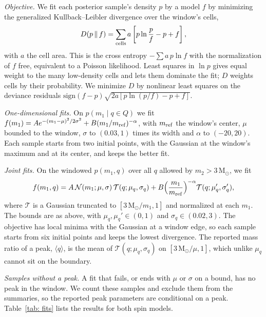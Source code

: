\documentclass[%
 reprint,
 amsmath,amssymb,
 aps,
 prl,
 nofootinbib,nobibnotes,
 floatfix,
]{revtex4-2}
\newcommand{\Msun}{\ensuremath{\mathrm{M}_{\odot}}}
\begin{document}
\textit{Objective.} We fit each posterior sample's density $p$ by a model $f$ by minimizing the generalized Kullback--Leibler divergence over the window's cells,
\begin{equation}
    D(p \,\|\, f) = \sum_{\rm cells} a \left[p \ln\frac{p}{f} - p + f\right],
\end{equation}
with $a$ the cell area. This is the cross entropy $-\sum a\, p \ln f$ with the normalization of $f$ free, equivalent to a Poisson likelihood. Least squares in $\ln p$ gives equal weight to the many low-density cells and lets them dominate the fit; $D$ weights cells by their probability. We minimize $D$ by nonlinear least squares on the deviance residuals $\mathrm{sign}(f - p)\sqrt{2a[p\ln(p/f) - p + f]}$.

\textit{One-dimensional fits.} On $p(m_1 \mid q \in Q)$ we fit $f(m_1) = A e^{-(m_1 - \mu)^2/2\sigma^2} + B(m_1/m_{\rm ref})^{-\alpha}$, with $m_{\rm ref}$ the window's center, $\mu$ bounded to the window, $\sigma$ to $(0.03, 1)$ times its width and $\alpha$ to $(-20, 20)$. Each sample starts from two initial points, with the Gaussian at the window's maximum and at its center, and keeps the better fit.

\textit{Joint fits.} On the windowed $p(m_1, q)$ over all $q$ allowed by $m_2 > 3\,\Msun$, we fit
\begin{equation}
    f(m_1, q) = A\, \mathcal{N}(m_1; \mu, \sigma)\, \mathcal{T}(q; \mu_q, \sigma_q) + B \Big(\frac{m_1}{m_{\rm ref}}\Big)^{-\alpha} \mathcal{T}(q; \mu_q', \sigma_q'),
\end{equation}
where $\mathcal{T}$ is a Gaussian truncated to $[3\,\Msun/m_1, 1]$ and normalized at each $m_1$. The bounds are as above, with $\mu_q, \mu_q' \in (0, 1)$ and $\sigma_q \in (0.02, 3)$. The objective has local minima with the Gaussian at a window edge, so each sample starts from six initial points and keeps the lowest divergence. The reported mass ratio of a peak, $\langle q \rangle$, is the mean of $\mathcal{T}(q; \mu_q, \sigma_q)$ on $[3\,\Msun/\mu, 1]$, which unlike $\mu_q$ cannot sit on the boundary.

\textit{Samples without a peak.} A fit that fails, or ends with $\mu$ or $\sigma$ on a bound, has no peak in the window. We count these samples and exclude them from the summaries, so the reported peak parameters are conditional on a peak. Table~\ref{tab: fits} lists the results for both spin models.
\end{document}
